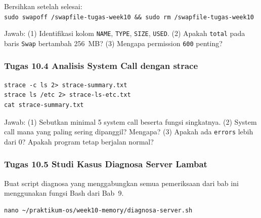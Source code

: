 \begin{notebox}
Bersihkan setelah selesai:\\
\texttt{sudo swapoff /swapfile-tugas-week10 \&\& sudo rm /swapfile-tugas-week10}
\end{notebox}

Jawab: (1) Identifikasi kolom \texttt{NAME}, \texttt{TYPE}, \texttt{SIZE}, \texttt{USED}.
(2) Apakah \texttt{total} pada baris \texttt{Swap} bertambah 256~MB? (3) Mengapa
permission \texttt{600} penting?

\subsubsection{Tugas 10.4 Analisis System Call dengan strace}

\begin{lstlisting}[caption={Simpan ringkasan dan detail system call}]
strace -c ls 2> strace-summary.txt
strace ls /etc 2> strace-ls-etc.txt
cat strace-summary.txt
\end{lstlisting}

Jawab: (1) Sebutkan minimal 5 system call beserta fungsi singkatnya. (2) System call
mana yang paling sering dipanggil? Mengapa? (3) Apakah ada \texttt{errors} lebih dari
0? Apakah program tetap berjalan normal?

\subsubsection{Tugas 10.5 Studi Kasus Diagnosa Server Lambat}

Buat script diagnosa yang menggabungkan semua pemeriksaan dari bab ini menggunakan
fungsi Bash dari Bab~9.

\begin{lstlisting}[caption={Buka file dengan nano}]
nano ~/praktikum-os/week10-memory/diagnosa-server.sh
\end{lstlisting}

